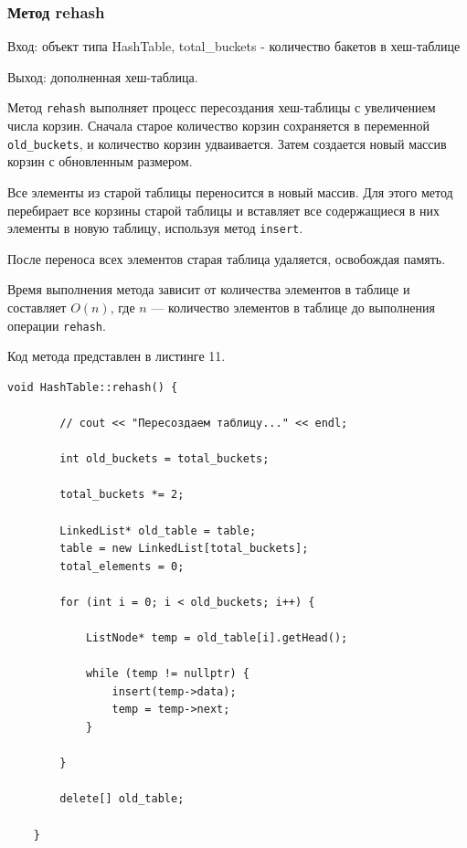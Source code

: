 \documentclass[11pt,a4paper,final]{article} %
\begin{document}
\subsubsection{Метод rehash}
Вход: объект типа HashTable, total\_buckets - количество бакетов в хеш-таблице \par
Выход: дополненная хеш-таблица. \par

\par Метод \texttt{rehash} выполняет процесс пересоздания хеш-таблицы с увеличением числа корзин. Сначала старое количество корзин сохраняется в переменной \texttt{old\_buckets}, и количество корзин удваивается. Затем создается новый массив корзин с обновленным размером.

\par Все элементы из старой таблицы переносится в новый массив. Для этого метод перебирает все корзины старой таблицы и вставляет все содержащиеся в них элементы в новую таблицу, используя метод \texttt{insert}.

\par После переноса всех элементов старая таблица удаляется, освобождая память.

\par Время выполнения метода зависит от количества элементов в таблице и составляет $O(n)$, где $n$ — количество элементов в таблице до выполнения операции \texttt{rehash}.

Код метода представлен в листинге 11.

\begin{lstlisting}[label=HashRehash, caption = Метод rehash]
	void HashTable::rehash() {
		
		// cout << "Пересоздаем таблицу..." << endl;
		
		int old_buckets = total_buckets;
		
		total_buckets *= 2;
		
		LinkedList* old_table = table; 
		table = new LinkedList[total_buckets];
		total_elements = 0;
		
		for (int i = 0; i < old_buckets; i++) {
			
			ListNode* temp = old_table[i].getHead();
			
			while (temp != nullptr) {
				insert(temp->data);
				temp = temp->next;
			}
			
		}
		
		delete[] old_table;
		
	}
\end{lstlisting}
\end{document}
